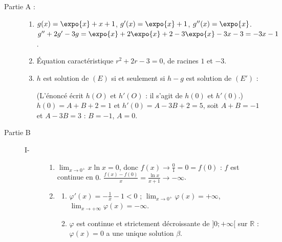 \begin{description}
	\item[Partie A :]
	\begin{enumerate}
		\item {}
			$g(x) = \expo{x} + x + 1$, $g'(x) = \expo{x} + 1$, $g''(x) = \expo{x}$.
			$g'' + 2g' - 3g = \expo{x} + 2\expo{x} + 2 - 3\expo{x} - 3x - 3 = -3x - 1$.
			\par\noindent{}
		\item {}
			Équation caractéristique $r^2 + 2r - 3 = 0$, de racines $1$ et $-3$.
			\par\noindent{}
		\item {}
			$h$ est solution de $(E)$ si et seulement si $h - g$ est solution de $(E')$ :
			\par\noindent{}
			(L'énoncé écrit $h(O)$ et $h'(O)$ : il s'agit de $h(0)$ et $h'(0)$.)
			$h(0) = A + B + 2 = 1$ et $h'(0) = A - 3B + 2 = 5$, soit $A + B = -1$ et $A - 3B = 3$ : $B = -1$, $A = 0$.
			\par\noindent{}
	\end{enumerate}
	\item[Partie B]
	\begin{description}
		\item[I-]
		\begin{enumerate}
			\item {}
				$\lim_{x\to 0^+} x\ln x = 0$, donc $f(x) \to \frac{0}{1} = 0 = f(0)$ : $f$ est continue en $0$.
				$\frac{f(x) - f(0)}{x} = \frac{\ln x}{x + 1} \to -\infty$.
				\par\noindent{}
			\item
			\begin{enumerate}
				\item {}
					$\varphi'(x) = -\frac{1}{x} - 1 < 0$ ; $\lim_{x\to 0^+}\varphi(x) = +\infty$, $\lim_{x\to+\infty}\varphi(x) = -\infty$.
					\par\noindent\ansbox{$\varphi$ est strictement décroissante de $+\infty$ à $-\infty$ sur $]0;+\infty[$.}
				\item {}
					$\varphi$ est continue et strictement décroissante de $]0;+\infty[$ sur $\mathbb{R}$ : $\varphi(x) = 0$ a une unique solution $\beta$.

\end{enumerate}
\end{enumerate}
\end{description}
\end{description}
